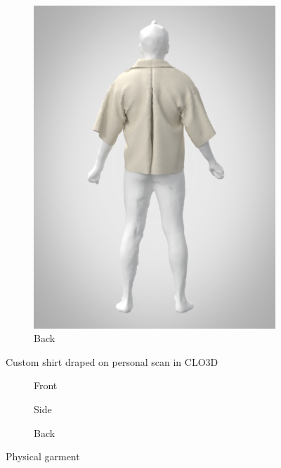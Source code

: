 \begin{figure}[H]
\begin{subfigure}[b]{0.3\textwidth}
        \includegraphics[width=\textwidth]{Images/render backpng.png}
        \caption{Back}
    \end{subfigure}
    \caption{Custom shirt draped on personal scan in CLO3D}
    \label{fig:renderedCLO}
\end{figure}

\begin{figure}[H]
    \centering
    \begin{subfigure}[b]{0.3\textwidth}
        \centering
        \caption{Front}
    \end{subfigure}
    \hfill
    \begin{subfigure}[b]{0.3\textwidth}
        \centering
        \caption{Side}
    \end{subfigure}
    \hfill
    \begin{subfigure}[b]{0.3\textwidth}
        \centering
        \caption{Back}
    \end{subfigure}
    \caption{Physical garment}
    \label{fig:personal_garment}
\end{figure}